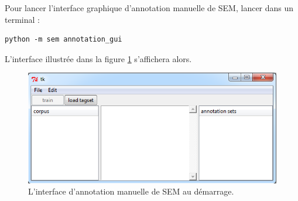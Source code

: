 \documentclass[manual-fr.tex]{subfiles}
\begin{document}
Pour lancer l'interface graphique d'annotation manuelle de SEM, lancer dans un terminal :

\begin{lstlisting}[style=pieceofcode,frame=single]
python -m sem annotation_gui
\end{lstlisting}

L'interface illustrée dans la figure \ref{fig:annotation_sem-01} s'affichera alors.

\begin{figure}[ht!]
    \begin{center}
    \includegraphics[scale=0.5]{fr/images/annotation_sem-01.png}
    \end{center}
    \caption{L'interface d'annotation manuelle de SEM au démarrage.}
    \label{fig:annotation_sem-01}
\end{figure}
\end{document}
